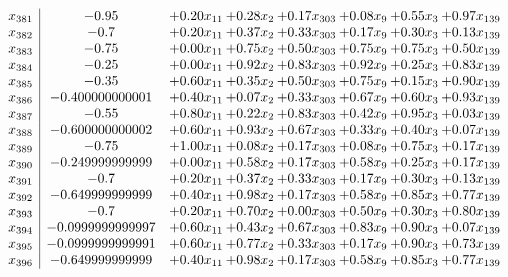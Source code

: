 \documentclass[8pt]{article}
\begin{document}
\[\begin{array}{c| c c@{\hskip 2pt} c@{\hskip 2pt} c@{\hskip 2pt} c@{\hskip 2pt} c@{\hskip 2pt} c@{\hskip 2pt} }
 x_{381}   &  -0.95 & +  0.20 x_{11} & +  0.28 x_{2} & +  0.17 x_{303} & +  0.08 x_{9} & +  0.55 x_{3} & +  0.97 x_{139}\\
 x_{382}   &  -0.7 & +  0.20 x_{11} & +  0.37 x_{2} & +  0.33 x_{303} & +  0.17 x_{9} & +  0.30 x_{3} & +  0.13 x_{139}\\
 x_{383}   &  -0.75 & +  0.00 x_{11} & +  0.75 x_{2} & +  0.50 x_{303} & +  0.75 x_{9} & +  0.75 x_{3} & +  0.50 x_{139}\\
 x_{384}   &  -0.25 & +  0.00 x_{11} & +  0.92 x_{2} & +  0.83 x_{303} & +  0.92 x_{9} & +  0.25 x_{3} & +  0.83 x_{139}\\
 x_{385}   &  -0.35 & +  0.60 x_{11} & +  0.35 x_{2} & +  0.50 x_{303} & +  0.75 x_{9} & +  0.15 x_{3} & +  0.90 x_{139}\\
 x_{386}   &  -0.400000000001 & +  0.40 x_{11} & +  0.07 x_{2} & +  0.33 x_{303} & +  0.67 x_{9} & +  0.60 x_{3} & +  0.93 x_{139}\\
 x_{387}   &  -0.55 & +  0.80 x_{11} & +  0.22 x_{2} & +  0.83 x_{303} & +  0.42 x_{9} & +  0.95 x_{3} & +  0.03 x_{139}\\
 x_{388}   &  -0.600000000002 & +  0.60 x_{11} & +  0.93 x_{2} & +  0.67 x_{303} & +  0.33 x_{9} & +  0.40 x_{3} & +  0.07 x_{139}\\
 x_{389}   &  -0.75 & +  1.00 x_{11} & +  0.08 x_{2} & +  0.17 x_{303} & +  0.08 x_{9} & +  0.75 x_{3} & +  0.17 x_{139}\\
 x_{390}   &  -0.249999999999 & +  0.00 x_{11} & +  0.58 x_{2} & +  0.17 x_{303} & +  0.58 x_{9} & +  0.25 x_{3} & +  0.17 x_{139}\\
 x_{391}   &  -0.7 & +  0.20 x_{11} & +  0.37 x_{2} & +  0.33 x_{303} & +  0.17 x_{9} & +  0.30 x_{3} & +  0.13 x_{139}\\
 x_{392}   &  -0.649999999999 & +  0.40 x_{11} & +  0.98 x_{2} & +  0.17 x_{303} & +  0.58 x_{9} & +  0.85 x_{3} & +  0.77 x_{139}\\
 x_{393}   &  -0.7 & +  0.20 x_{11} & +  0.70 x_{2} & +  0.00 x_{303} & +  0.50 x_{9} & +  0.30 x_{3} & +  0.80 x_{139}\\
 x_{394}   &  -0.0999999999997 & +  0.60 x_{11} & +  0.43 x_{2} & +  0.67 x_{303} & +  0.83 x_{9} & +  0.90 x_{3} & +  0.07 x_{139}\\
 x_{395}   &  -0.0999999999991 & +  0.60 x_{11} & +  0.77 x_{2} & +  0.33 x_{303} & +  0.17 x_{9} & +  0.90 x_{3} & +  0.73 x_{139}\\
 x_{396}   &  -0.649999999999 & +  0.40 x_{11} & +  0.98 x_{2} & +  0.17 x_{303} & +  0.58 x_{9} & +  0.85 x_{3} & +  0.77 x_{139}\\

\end{array}\]
\end{document}
